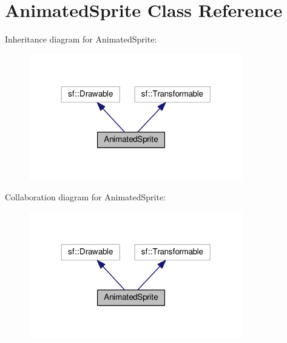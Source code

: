 \hypertarget{class_animated_sprite}{}\section{Animated\+Sprite Class Reference}
\label{class_animated_sprite}


Inheritance diagram for Animated\+Sprite\+:
\nopagebreak
\begin{figure}[H]
\begin{center}
\leavevmode
\includegraphics[width=264pt]{class_animated_sprite__inherit__graph}
\end{center}
\end{figure}


Collaboration diagram for Animated\+Sprite\+:
\nopagebreak
\begin{figure}[H]
\begin{center}
\leavevmode
\includegraphics[width=264pt]{class_animated_sprite__coll__graph}
\end{center}
\end{figure}
